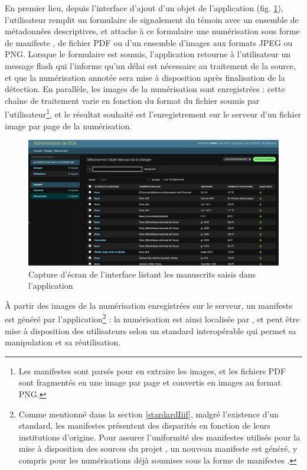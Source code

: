 	En premier lieu, depuis l'interface d'ajout d'un objet de l'application \eida (fig. \ref{fig:eida_list}), l'utilisateur remplit un formulaire de signalement du témoin avec un ensemble de métadonnées descriptives, et attache à ce formulaire une numérisation sous forme de manifeste \iiif, de fichier PDF ou d'un ensemble d'images aux formats JPEG ou PNG. Lorsque le formulaire est soumis, l'application retourne à l'utilisateur un message flash qui l'informe qu'un délai est nécessaire au traitement de la source, et que la numérisation annotée sera mise à disposition après finalisation de la détection. En parallèle, les images de la numérisation sont enregistrées : cette chaîne de traitement varie en fonction du format du fichier soumis par l'utilisateur\footnote{Les manifestes \iiif sont parsés pour en extraire les images, et les fichiers PDF sont fragmentés en une image par page et convertis en images au format PNG.}, et le résultat souhaité est l'enregistrement sur le serveur d'un fichier image par page de la numérisation.
	
	\begin{figure}[h]
		\centering
		\includegraphics[width=16cm]{images/eida_list.png}
		\caption{Capture d'écran de l'interface listant les manuscrits saisis dans l'application \eida}
		\label{fig:eida_list}
	\end{figure}

	À partir des images de la numérisation enregistrées sur le serveur, un manifeste \iiif est généré par l'application\footnote{Comme mentionné dans la section \ref{stardardIiif}, malgré l'existence d'un standard, les manifestes \iiif présentent des disparités en fonction de leurs institutions d'origine. Pour assurer l'uniformité des manifestes utilisés pour la mise à disposition des sources du projet \eida, un nouveau manifeste est généré, y compris pour les numérisations déjà soumises sous la forme de manifestes \iiif.} : la numérisation est ainsi localisée par \URL, et peut être mise à disposition des utilisateurs selon un standard interopérable qui permet sa manipulation et sa réutilisation.
	
